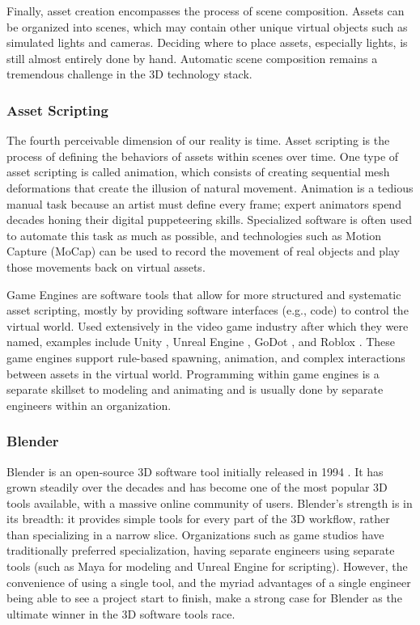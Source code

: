 \documentclass{article}
\begin{document}
Finally, asset creation encompasses the process of scene composition. Assets can be organized into scenes, which may contain other unique virtual objects such as simulated lights and cameras. Deciding where to place assets, especially lights, is still almost entirely done by hand. Automatic scene composition remains a tremendous challenge in the 3D technology stack.

\subsubsection{Asset Scripting}
\label{sec:assetscripting}

The fourth perceivable dimension of our reality is time. Asset scripting is the process of defining the behaviors of assets within scenes over time. One type of asset scripting is called animation, which consists of creating sequential mesh deformations that create the illusion of natural movement. Animation is a tedious manual task because an artist must define every frame; expert animators spend decades honing their digital puppeteering skills. Specialized software is often used to automate this task as much as possible, and technologies such as Motion Capture (MoCap) can be used to record the movement of real objects and play those movements back on virtual assets.

Game Engines are software tools that allow for more structured and systematic asset scripting, mostly by providing software interfaces (e.g., code) to control the virtual world. Used extensively in the video game industry after which they were named, examples include Unity \cite{unity3d}, Unreal Engine \cite{unrealengine}, GoDot \cite{godot}, and Roblox \cite{roblox}. These game engines support rule-based spawning, animation, and complex interactions between assets in the virtual world. Programming within game engines is a separate skillset to modeling and animating and is usually done by separate engineers within an organization.

\subsubsection{Blender}
\label{sec:blender}

Blender is an open-source 3D software tool initially released in 1994 \cite{blender}. It has grown steadily over the decades and has become one of the most popular 3D tools available, with a massive online community of users. Blender’s strength is in its breadth: it provides simple tools for every part of the 3D workflow, rather than specializing in a narrow slice. Organizations such as game studios have traditionally preferred specialization, having separate engineers using separate tools (such as Maya for modeling and Unreal Engine for scripting). However, the convenience of using a single tool, and the myriad advantages of a single engineer being able to see a project start to finish, make a strong case for Blender as the ultimate winner in the 3D software tools race. 
\end{document}
